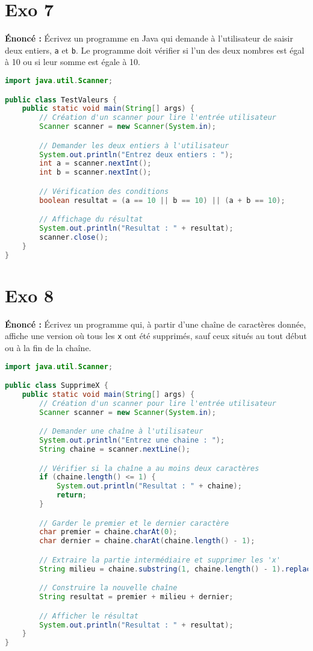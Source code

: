 \documentclass{article}
\begin{document}
\section*{Exo 7}
\noindent \textbf{Énoncé :} Écrivez un programme en Java qui demande \`a l'utilisateur de saisir deux entiers, \texttt{a} et \texttt{b}. Le programme doit vérifier si l'un des deux nombres est égal \`a 10 ou si leur somme est égale \`a 10.

\begin{lstlisting}[language=Java]
import java.util.Scanner;

public class TestValeurs {
    public static void main(String[] args) {
        // Création d'un scanner pour lire l'entrée utilisateur
        Scanner scanner = new Scanner(System.in);

        // Demander les deux entiers à l'utilisateur
        System.out.println("Entrez deux entiers : ");
        int a = scanner.nextInt();
        int b = scanner.nextInt();

        // Vérification des conditions
        boolean resultat = (a == 10 || b == 10) || (a + b == 10);

        // Affichage du résultat
        System.out.println("Resultat : " + resultat);
        scanner.close();
    }
}
\end{lstlisting}
\clearpage

\section*{Exo 8}
\noindent \textbf{Énoncé :} Écrivez un programme qui, \`a partir d'une cha\^ine de caract\`eres donn\'ee, affiche une version o\`u tous les \texttt{x} ont été supprimés, sauf ceux situés au tout début ou \`a la fin de la cha\^ine.

\begin{lstlisting}[language=Java]
import java.util.Scanner;

public class SupprimeX {
    public static void main(String[] args) {
        // Création d'un scanner pour lire l'entrée utilisateur
        Scanner scanner = new Scanner(System.in);

        // Demander une chaîne à l'utilisateur
        System.out.println("Entrez une chaine : ");
        String chaine = scanner.nextLine();

        // Vérifier si la chaîne a au moins deux caractères
        if (chaine.length() <= 1) {
            System.out.println("Resultat : " + chaine);
            return;
        }

        // Garder le premier et le dernier caractère
        char premier = chaine.charAt(0);
        char dernier = chaine.charAt(chaine.length() - 1);

        // Extraire la partie intermédiaire et supprimer les 'x'
        String milieu = chaine.substring(1, chaine.length() - 1).replace("x", "");

        // Construire la nouvelle chaîne
        String resultat = premier + milieu + dernier;

        // Afficher le résultat
        System.out.println("Resultat : " + resultat);
    }
}
\end{lstlisting}
\clearpage
\end{document}
